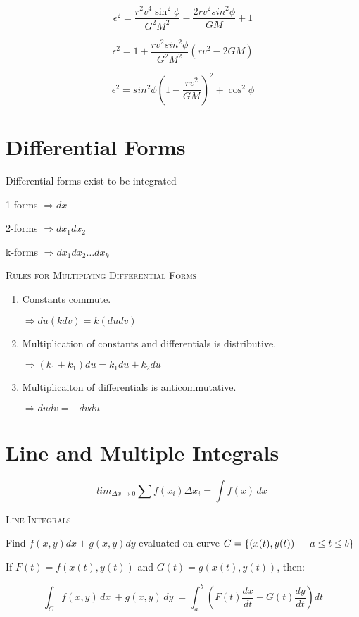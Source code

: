 \documentclass{article}
\begin{document}
\[
\epsilon^2 = \frac{r^2v^4\sin^2{\phi}}{G^2M^2} - \frac{2rv^2sin^2{\phi}}{GM} + 1
\]

\[
\epsilon^2 = 1 + \frac{rv^2sin^2{\phi}}{G^2M^2}\left( rv^2 - 2GM \right)
\]


\[
\epsilon^2 = sin^2{\phi} \left(1-\frac{rv^2}{GM} \right)^2 + \cos^2{\phi}
\]

\bigskip

\section{Differential Forms}

Differential forms exist to be integrated

1-forms $\Rightarrow dx$ 

2-forms $\Rightarrow dx_1dx_2$

k-forms $\Rightarrow dx_1dx_2 \ldots dx_k$

\bigskip

\textsc{Rules for Multiplying Differential Forms}
\begin{enumerate}
\item Constants commute.  

$\Rightarrow du(kdv) = k(dudv)$
\item Multiplication of constants and differentials is distributive.

$\Rightarrow (k_1 + k_1)du = k_1du + k_2du$
\item Multiplicaiton of differentials is anticommutative.

$\Rightarrow dudv = -dvdu$
\end{enumerate}

\bigskip

\section{Line and Multiple Integrals}

\[
lim_{\Delta{x} \to 0} \sum f(x_i)\Delta{x_i} = \int f(x)\,dx\
\]

\textsc{Line Integrals}

Find $f(x, y)dx + g(x, y)dy$ evaluated on curve $C = \{ \left(x(t), y(t)\right) \hspace{2mm} | \hspace{2mm} a \le t \le b \}$

\bigskip

If $F(t) = f\left(x(t), y(t)\right)$ and $G(t) = g\left(x(t), y(t)\right)$, then:

\[
\int_C f(x, y)\,dx\ + g(x, y)\,dy\ = \int_a^b \left( F(t)\frac{dx}{dt} + G(t)\frac{dy}{dt} \right)dt
\]
\end{document}
